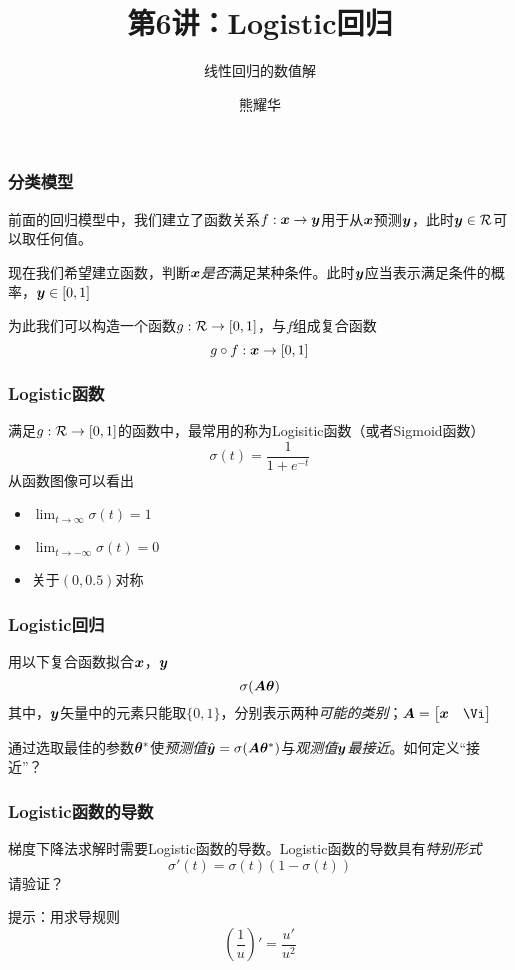 \documentclass[14pt]{beamer}
\title{第6讲：Logistic回归}
\subtitle{线性回归的数值解}
\author{熊耀华}
\institute{交通工程系}
\begin{document}
\begin{frame}
    \titlepage
\end{frame}

\begin{frame}
  \frametitle{分类模型}
  前面的回归模型中，我们建立了函数关系$f:\bm{x}\to\bm{y}$用于从$\bm{x}$预测$\bm{y}$，此时$\bm{y}\in \mathcal{R}$可以取任何值。

  现在我们希望建立函数，判断$\bm{x}$\emph{是否}满足某种条件。此时$\bm{y}$应当表示满足条件的概率，$\bm{y}\in[0,1]$

  为此我们可以构造一个函数$g:\mathcal{R}\to[0,1]$，与$f$组成复合函数
  \begin{equation}
    g\circ f:\bm{x}\to[0,1]
  \end{equation}
\end{frame}

\begin{frame}
  \frametitle{Logistic函数}
  满足$g:\mathcal{R}\to[0,1]$的函数中，最常用的称为Logisitic函数（或者Sigmoid函数）
  \begin{equation}
    \sigma(t)=\frac{1}{1+e^{-t}}
  \end{equation}
  从函数图像可以看出
  \begin{itemize}
    \item $\lim_{t\to\infty}\sigma(t)=1$
    \item $\lim_{t\to-\infty}\sigma(t)=0$
    \item 关于$(0, 0.5)$对称
  \end{itemize}
  

\end{frame}
\begin{frame}
  \frametitle{Logistic回归}
  用以下复合函数拟合$\bm{x}$，$\bm{y}$
  \begin{equation}
    \sigma(\bm{A}\bm{\theta})
  \end{equation}
  其中，$\bm{y}$矢量中的元素只能取$\{0,1\}$，分别表示两种\emph{可能的类别}；$\MA=\begin{bmatrix}
    \Vx & \Vi
  \end{bmatrix}$

  通过选取最佳的参数$\bm{\theta}^*$使\emph{预测值}$\hat{\bm{y}}=\sigma(\bm{A}\bm{\theta}^*)$与\emph{观测值}$\bm{y}$\emph{最接近}。如何定义“接近”？
\end{frame}

\begin{frame}
  \frametitle{Logistic函数的导数}
  梯度下降法求解时需要Logistic函数的导数。Logistic函数的导数具有\emph{特别形式}
  \begin{equation}
    \sigma'(t)=\sigma(t)(1-\sigma(t))
  \end{equation}
  请验证？
  
  提示：用求导规则
  $$\left(\frac{1}{u}\right)'=\frac{u'}{u^2}$$
\end{frame}
\end{document}
